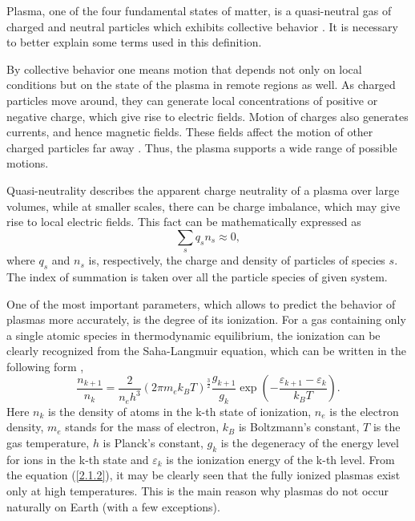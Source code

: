Plasma, one of the four fundamental states of matter, is a quasi-neutral gas of charged and neutral particles which exhibits collective behavior \cite{Chen1984}. It is necessary to better explain some terms used in this definition.

By collective behavior one means motion that depends not only on local conditions but on the state of the plasma in remote regions as well. As charged particles move around, they can generate local concentrations of positive or negative charge, which give rise to electric fields. Motion of charges also generates currents, and hence magnetic fields. These fields affect the motion of other charged particles far away \cite{Chen1984}. Thus, the plasma supports a wide range of possible motions.

Quasi-neutrality describes the apparent charge neutrality of a plasma over large volumes, while at smaller scales, there can be charge imbalance, which may give rise to local electric fields. This fact can be mathematically expressed as
\begin{equation}
\label{2.1.1}
\sum_{s} q_s n_s \approx 0,
\end{equation}
where $ q_s $ and $ n_s $ is, respectively, the charge and density of particles of species $ s $. The index of summation is taken over all the particle species of given system.

One of the most important parameters, which allows to predict the behavior of plasmas more accurately, is the degree of its ionization. For a gas containing only a single atomic species in thermodynamic equilibrium, the ionization can be clearly recognized from the Saha-Langmuir equation, which can be written in the following form \cite{Saha1920, Saha1921, Langmuir1923, Fridman2008},
\begin{equation}
\label{2.1.2}
\frac{n_{k+1}}{n_k} = \frac{2}{n_e h^3}\left(2\pi m_e k_B T\right)^{\frac{3}{2}} \frac{g_{k+1}}{g_k} \exp\left(-\frac{\varepsilon_{k+1} - \varepsilon_{k}}{k_{B} T} \right).
\end{equation}
Here $ n_k $ is the density of atoms in the k-th state of ionization, $ n_e $ is the electron density, $ m_e $ stands for the mass of electron, $ k_B $ is Boltzmann's constant, $ T $ is the gas temperature, $ h $ is Planck's constant, $ g_k $ is the degeneracy of the energy level for ions in the k-th state and $ \varepsilon_k $ is the ionization energy of the k-th level. From the equation (\ref{2.1.2}), it may be clearly seen that the fully ionized plasmas exist only at high temperatures. This is the main reason why plasmas do not occur naturally on Earth (with a few exceptions).

